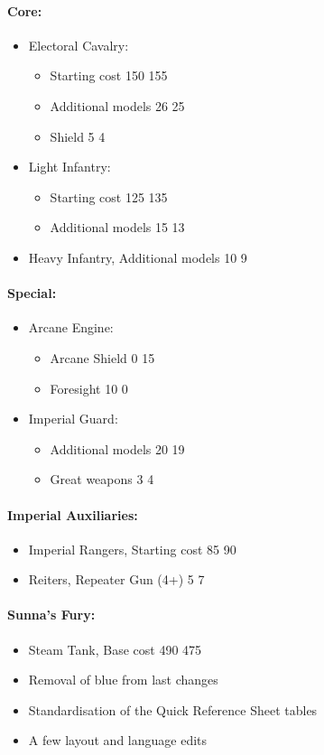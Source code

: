 \begin{multicols}{2}
\paragraph{Core:}
\begin{itemize}
	\item Electoral Cavalry:
	\begin{itemize}
		\item Starting cost 150 \costup{} 155
		\item Additional models 26 \costdown{} 25
		\item Shield 5 \costdown{} 4
	\end{itemize}
	\columnbreak
	\item Light Infantry:
	\begin{itemize}
		\item Starting cost 125 \costup{} 135
		\item Additional models 15 \costdown{} 13
	\end{itemize}
	\item Heavy Infantry, Additional models 10 \costdown{} 9
\end{itemize}
\paragraph{Special:}
\begin{itemize}
	\item Arcane Engine:
	\begin{itemize}
		\item Arcane Shield 0 \costup{} 15
		\item Foresight 10 \costdown{} 0
	\end{itemize}
	\item Imperial Guard:
	\begin{itemize}
		\item Additional models 20 \costdown{} 19
		\item Great weapons 3 \costup{} 4
	\end{itemize}
\end{itemize}
\paragraph{Imperial Auxiliaries:}
\begin{itemize}
	\item Imperial Rangers, Starting cost 85 \costup{} 90
	\item Reiters, Repeater Gun (4+) 5 \costup{} 7
\end{itemize}
\paragraph{Sunna's Fury:}
\begin{itemize}
	\item Steam Tank, Base cost 490 \costdown{} 475
\end{itemize}
\end{multicols}

\subtitle{beta 2.1.5}

\begin{itemize}
\item Removal of blue from last changes
\item Standardisation of the Quick Reference Sheet tables
\item A few layout and language edits
\end{itemize}
